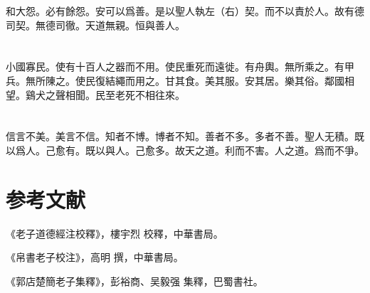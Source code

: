 \documentclass[a5paper]{ctexbook}
\begin{document}
    和大怨。必有餘怨。安可以爲善。是以聖人執左（右）契。而不以責於人。故有德司契。無德司徹。天道無親。恒與善人。

    \chapter{}

    小國寡民。使有十百人之器而不用。使民重死而遠徙。有舟輿。無所乘之。有甲兵。無所陳之。使民復結繩而用之。甘其食。美其服。安其居。樂其俗。鄰國相望。鷄犬之聲相聞。民至老死不相往來。

    \chapter{}

    信言不美。美言不信。知者不博。博者不知。善者不多。多者不善。聖人无積。既以爲人。己愈有。既以與人。己愈多。故天之道。利而不害。人之道。爲而不爭。

    \chapter*{参考文献}
    《老子道德經注校釋》，樓宇烈 校釋，中華書局。

    《帛書老子校注》，高明 撰，中華書局。

    《郭店楚簡老子集釋》，彭裕商、吴毅强 集釋，巴蜀書社。
\end{document}
